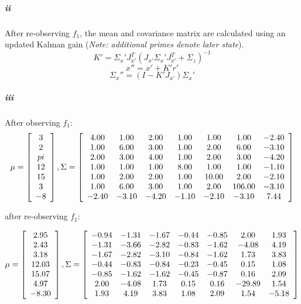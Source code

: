 \documentclass[12pt]{article}
\begin{document}
\subparagraph{ii}
After re-observing $f_1$, the mean and covariance matrix are calculated using an updated Kalman gain (\emph{Note: additional primes denote
    later state}).
$$K' = \Sigma_x' J_{x'}^T(J_{x'} \Sigma_x' J_{x'}^T + \Sigma_z)^{-1} $$
$$x'' = x' + K'r'$$
$$\Sigma_x'' = (I - K'J_{x'}) \Sigma_x'$$

\subparagraph{iii}
After observing $f_1$: \\
$$\mu = \left[ \begin{array}{c}
3 \\
2 \\
pi \\
12 \\
15 \\
3 \\
-8
\end{array}\right],
\Sigma = \left[ \begin{array}{c c c c c c c}
4.00 & 1.00 & 2.00 & 1.00 & 1.00 & 1.00 & -2.40 \\
1.00 & 6.00 & 3.00 & 1.00 & 2.00 & 6.00 & -3.10 \\
2.00 & 3.00 & 4.00 & 1.00 & 2.00 & 3.00 & -4.20 \\
1.00 & 1.00 & 1.00 & 8.00 & 1.00 & 1.00 & -1.10 \\
1.00 & 2.00 & 2.00 & 1.00 & 10.00 & 2.00 & -2.10 \\
1.00 & 6.00 & 3.00 & 1.00 & 2.00 & 106.00 & -3.10 \\
-2.40 & -3.10 & -4.20 & -1.10 & -2.10 & -3.10 & 7.44
\end{array}\right]$$

after re-observing $f_1$:

$$\mu = \left[ \begin{array}{c}
2.95\\
2.43\\
3.18\\
12.03\\
15.07\\
4.97\\
-8.30\\
\end{array}\right],
\Sigma = \left[ \begin{array}{c c c c c c c}
-0.94 & -1.31 & -1.67 & -0.44 & -0.85 & 2.00 & 1.93 \\
-1.31& -3.66 & -2.82 & -0.83 & -1.62 & -4.08 & 4.19 \\
-1.67 & -2.82 & -3.10 & -0.84 & -1.62 & 1.73 & 3.83 \\
-0.44 & -0.83 & -0.84 & -0.23 & -0.45 & 0.15 & 1.08 \\
-0.85 & -1.62 & -1.62 & -0.45 & -0.87 & 0.16 & 2.09 \\
2.00 & -4.08 & 1.73 & 0.15 & 0.16 & -29.89 & 1.54 \\
1.93 & 4.19 & 3.83 & 1.08 & 2.09 & 1.54 & -5.18\\
\end{array}\right]$$
\end{document}
